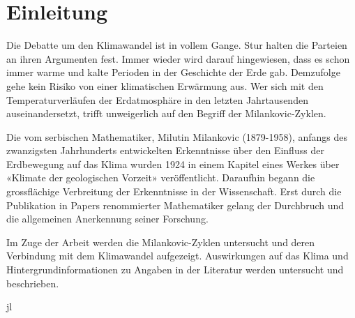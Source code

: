 %
%
%
%
\section{Einleitung\label{milankovic:section:Einleitung}}

Die Debatte um den Klimawandel ist in vollem Gange.
Stur halten die Parteien an ihren Argumenten fest.
Immer wieder wird darauf hingewiesen, dass es schon immer warme und kalte Perioden in der Geschichte der Erde gab.
Demzufolge gehe kein Risiko von einer klimatischen Erwärmung aus.
Wer sich mit den Temperaturverläufen der Erdatmosphäre in den letzten Jahrtausenden auseinandersetzt, trifft unweigerlich auf den Begriff der Milankovic-Zyklen.

Die vom serbischen Mathematiker, Milutin Milankovic (1879-1958), anfangs des zwanzigsten Jahrhunderts entwickelten Erkenntnisse über den Einfluss der Erdbewegung auf das Klima wurden 1924 in einem Kapitel eines Werkes über «Klimate der geologischen Vorzeit» veröffentlicht.
Daraufhin begann die grossflächige Verbreitung der Erkenntnisse in der Wissenschaft.
Erst durch die Publikation in Papers renommierter Mathematiker gelang der Durchbruch und die allgemeinen Anerkennung seiner Forschung.

Im Zuge der Arbeit werden die Milankovic-Zyklen untersucht und deren Verbindung mit dem Klimawandel aufgezeigt. Auswirkungen auf das Klima und Hintergrundinformationen zu Angaben in der Literatur werden untersucht und beschrieben.

jl

